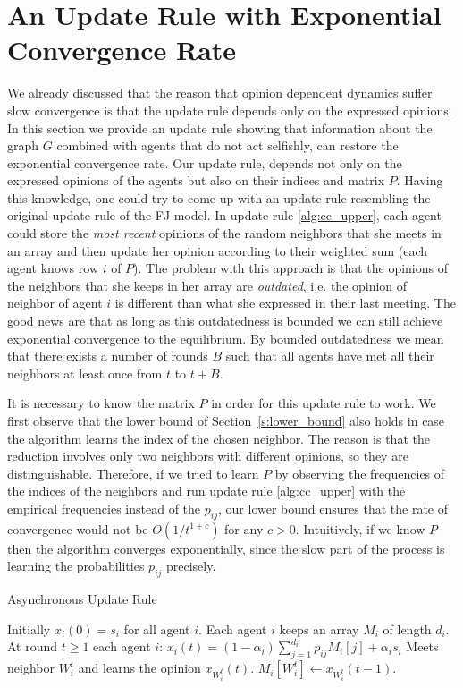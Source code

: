 \section{An Update Rule with Exponential Convergence Rate}\label{s:cc_convergence}

We already discussed that the reason that opinion dependent dynamics suffer slow
convergence is that the update rule depends only on the expressed opinions.
In this section we provide an update rule showing that information about the
graph $G$ combined with agents that do not act selfishly, can restore the
exponential convergence rate.
Our update rule, depends not only on the expressed opinions of the
agents but also on their indices and matrix $P$.
Having this knowledge, one could try to come up with an
update rule resembling the original update rule of the FJ model.
In update rule \ref{alg:cc_upper}, each agent could store the
\emph{most recent} opinions of the random neighbors that she meets in an array
and then update her
opinion according to their weighted sum (each agent knows row $i$ of $P$).
The problem with this approach is that the opinions of the neighbors
that she keeps in her array are \emph{outdated}, i.e. the opinion of
neighbor of agent $i$ is different than what she expressed in their
last meeting.  The good news are that as long as this outdatedness
is bounded we can still achieve exponential convergence to the
equilibrium.  By bounded outdatedness we mean that there exists a
number of rounds $B$ such that all agents have met all their neighbors
at least once from $t$ to $t+B$.
\begin{remark}
It is necessary to know the matrix $P$ in order for this
update rule to work. We first observe that the lower bound of
Section~\ref{s:lower_bound} also holds in case the algorithm learns the index
of the chosen neighbor. The reason is that the reduction involves only two neighbors
with different opinions, so they are distinguishable.
Therefore, if we tried to learn $P$ by observing the frequencies
of the indices of the neighbors and run update rule \ref{alg:cc_upper}
with the empirical frequencies instead of the $p_{ij}$, our lower bound
ensures that the rate of convergence would not be $O(1/t^{1+c})$ for any $c>0$.
Intuitively, if we know $P$ then the algorithm converges exponentially,
since the slow part of the process is learning the probabilities $p_{ij}$
precisely.
\end{remark}
\vspace{-5mm}
\begin{algorithm}
  \caption{Asynchronous Update Rule}
  \label{alg:cc_upper}
  \begin{algorithmic}[1]
    \STATE Initially $x_i(0) = s_i$ for all agent $i$.
    \STATE Each agent $i$ keeps an array $M_i$ of length $d_i$.
    \STATE At round $t\geq 1$ each agent $i$:
    \bindent
    \STATE $x_i(t) = (1-\alpha_i)\sum_{j=1}^{d_i} p_{ij} M_i[j] + \alpha_is_i$
    \STATE Meets neighbor $W_i^t$ and learns the opinion $x_{W_i^t}(t)$.
    \STATE $M_i[W_i^t] \gets x_{W_i^t}(t-1)$.
    \eindent
  \end{algorithmic}
\end{algorithm}

